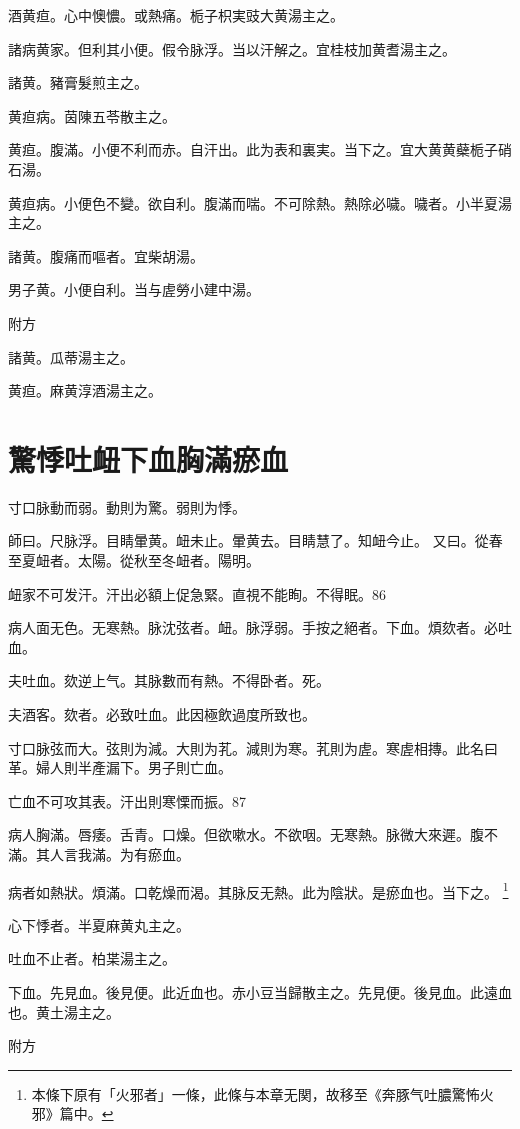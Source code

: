 酒黄疸。心中懊憹。或熱痛。栀子{\khaaitp 枳実豉}大黄湯主之。

諸病黄家。但利其小便。假令脉浮。当以汗解之。宜桂枝加黄耆湯主之。

諸黄。豬膏髮煎主之。

黄疸病。茵陳五苓散主之。

黄疸。腹滿。小便不利而赤。自汗出。此为表和裏実。当下之。宜大黄{\khaaitp 黄蘗栀子}硝石湯。

黄疸病。小便色不變。欲自利。腹滿而喘。不可除熱。熱除必噦。噦者。小半夏湯主之。

諸黄。腹痛而嘔者。宜柴胡湯。

男子黄。小便自利。当与虗勞小建中湯。

附方

諸黄。瓜蒂湯主之。

黄疸。麻黄淳酒湯主之。

\chapter{驚悸吐衄下血胸滿瘀血}

寸口脉動而弱。動則为驚。弱則为悸。

師曰。尺脉浮。目睛暈黄。衄未止。暈黄去。目睛慧了。知衄今止。
又曰。從春至夏衄者。太陽。從秋至冬衄者。陽明。

衄家不可发汗。汗出必額上促急{\khaaitp 緊}。直視不能眴。不得眠。86

病人面无色。无寒熱。脉沈弦者。衄。{\khaaitp 脉}浮弱。手按之絕者。下血。煩欬者。必吐血。

夫吐血。欬逆上气。其脉數而有熱。不得卧者。死。

夫酒客。欬者。必致吐血。此因極飲過度所致也。

寸口脉弦而大。弦則为減。大則为芤。減則为寒。芤則为虗。寒虗相摶。此名曰革。婦人則半產漏下。男子則亡血。

亡血不可攻其表。汗出則寒慄而振。87

病人胸滿。唇痿。舌青。口燥。但欲嗽水。不欲咽。无寒熱。脉微大來遲。腹不滿。其人言我滿。为有瘀血。

病者如熱狀。煩滿。口乾燥而渴。其脉反无熱。此为陰狀。是瘀血也。当下之。
	\footnote{
		本條下原有「火邪者」一條，此條与本章无関，故移至《奔豚气吐膿驚怖火邪》篇中。
	}

心下悸者。半夏麻黄丸主之。

吐血不止者。柏枼湯主之。

下血。先見血。後見便。此近血也。赤小豆当歸散主之。先見便。後見血。此遠血也。黄土湯主之。

附方

